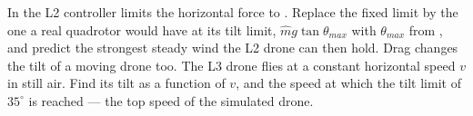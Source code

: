 \begin{exercises}
\exercise[2] In  the L2 controller limits the horizontal force to . Replace the fixed limit by the one a real quadrotor would have at its tilt limit, $\hat m g\tan\theta_{max}$ with $\theta_{max}$ from , and predict the strongest steady wind the L2 drone can then hold.
\exercise[3] Drag changes the tilt of a moving drone too. The L3 drone flies at a constant horizontal speed $v$ in still air. Find its tilt as a function of $v$, and the speed at which the tilt limit of $35^\circ$ is reached — the top speed of the simulated drone.
\end{exercises}
